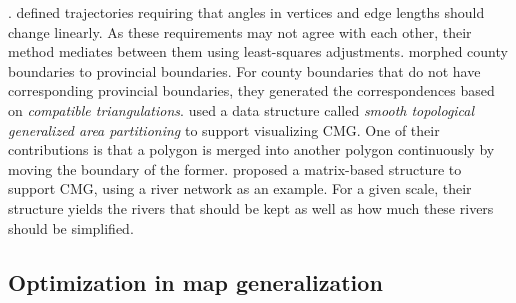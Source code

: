 \documentclass[acmsmall,natbib=false]{acmart}
\begin{document}
\parencite{Chazal2010BallMap}.
\textcite{Peng2013LSA} defined trajectories requiring that
angles in vertices and edge lengths should change linearly.
As these requirements may not agree with each other,
their method mediates between them using 
least-squares adjustments.
\textcite{Peng2016Admin} morphed county boundaries
to provincial boundaries.
For county boundaries that do not have corresponding 
provincial boundaries, they generated the correspondences based 
on \emph{compatible triangulations}.
\Textcite{vanOosterom2014Support} used
a data structure called
\emph{smooth topological generalized area partitioning}
to support visualizing CMG.
One of their contributions is that
a polygon is merged into another polygon continuously
by moving the boundary of the former.
\textcite{Huang2017Matrix} proposed a matrix-based structure 
to support CMG,
using a river network as an example.
For a given scale, 
their structure yields the rivers that should be kept 
as well as how much these rivers should be simplified.



\subsection{Optimization in map generalization}
\end{document}
